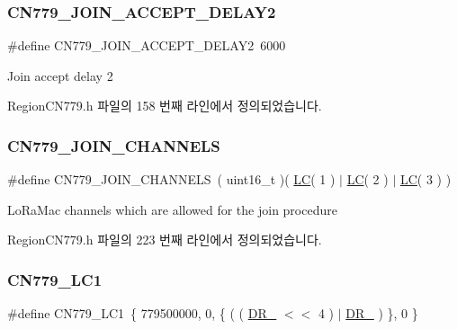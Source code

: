 \subsubsection{\texorpdfstring{C\+N779\+\_\+\+J\+O\+I\+N\+\_\+\+A\+C\+C\+E\+P\+T\+\_\+\+D\+E\+L\+A\+Y2}{CN779\_JOIN\_ACCEPT\_DELAY2}}
{\footnotesize\ttfamily \#define C\+N779\+\_\+\+J\+O\+I\+N\+\_\+\+A\+C\+C\+E\+P\+T\+\_\+\+D\+E\+L\+A\+Y2~6000}

Join accept delay 2 

Region\+C\+N779.\+h 파일의 158 번째 라인에서 정의되었습니다.

\mbox{\label{group___r_e_g_i_o_n_c_n779_gaad1a9c76c54bb1be159e6638c1aa768f}} 
\subsubsection{\texorpdfstring{C\+N779\+\_\+\+J\+O\+I\+N\+\_\+\+C\+H\+A\+N\+N\+E\+LS}{CN779\_JOIN\_CHANNELS}}
{\footnotesize\ttfamily \#define C\+N779\+\_\+\+J\+O\+I\+N\+\_\+\+C\+H\+A\+N\+N\+E\+LS~( uint16\+\_\+t )( \mbox{\hyperlink{group___r_e_g_i_o_n_ga12fa17e5c1016e01a9d82c25027deb1b}{LC}}( 1 ) $\vert$ \mbox{\hyperlink{group___r_e_g_i_o_n_ga12fa17e5c1016e01a9d82c25027deb1b}{LC}}( 2 ) $\vert$ \mbox{\hyperlink{group___r_e_g_i_o_n_ga12fa17e5c1016e01a9d82c25027deb1b}{LC}}( 3 ) )}

Lo\+Ra\+Mac channels which are allowed for the join procedure 

Region\+C\+N779.\+h 파일의 223 번째 라인에서 정의되었습니다.

\mbox{\label{group___r_e_g_i_o_n_c_n779_ga1318d698c85f15c35bd4953830d5df48}} 
\subsubsection{\texorpdfstring{C\+N779\+\_\+\+L\+C1}{CN779\_LC1}}
{\footnotesize\ttfamily \#define C\+N779\+\_\+\+L\+C1~\{ 779500000, 0, \{ ( ( \mbox{\hyperlink{group___r_e_g_i_o_n_ga872e12c82020c02a7f70a1c6ed1375df}{D\+R\+\_}} $<$$<$ 4 ) $\vert$ \mbox{\hyperlink{group___r_e_g_i_o_n_ga6c4ef966b4f3d5eb7597b087f2b97095}{D\+R\+\_}} ) \}, 0 \}}

